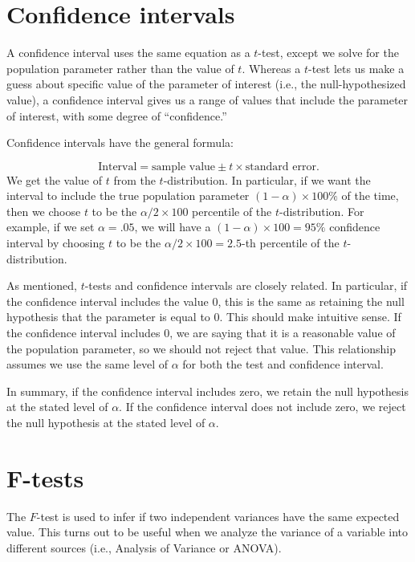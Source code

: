\documentclass[
  letterpaper,
  DIV=11,
  numbers=noendperiod]{scrreprt}
\begin{document}
\hypertarget{confidence-intervals}{%
\section{Confidence intervals}\label{confidence-intervals}}

A confidence interval uses the same equation as a \(t\)-test, except we
solve for the population parameter rather than the value of \(t\).
Whereas a \(t\)-test lets us make a guess about specific value of the
parameter of interest (i.e., the null-hypothesized value), a confidence
interval gives us a range of values that include the parameter of
interest, with some degree of ``confidence.''

Confidence intervals have the general formula:

\[\text{Interval} = \text{sample value} \pm t \times {\text{standard error}}. \]
We get the value of \(t\) from the \(t\)-distribution. In particular, if
we want the interval to include the true population parameter
\((1-\alpha) \times 100\%\) of the time, then we choose \(t\) to be the
\(\alpha/2 \times 100\) percentile of the \(t\)-distribution. For
example, if we set \(\alpha = .05\), we will have a
\((1-\alpha) \times 100 = 95\%\) confidence interval by choosing \(t\)
to be the \(\alpha/2 \times 100 = 2.5\)-th percentile of the
\(t\)-distribution.

As mentioned, \(t\)-tests and confidence intervals are closely related.
In particular, if the confidence interval includes the value \(0\), this
is the same as retaining the null hypothesis that the parameter is equal
to \(0\). This should make intuitive sense. If the confidence interval
includes \(0\), we are saying that it is a reasonable value of the
population parameter, so we should not reject that value. This
relationship assumes we use the same level of \(\alpha\) for both the
test and confidence interval.

In summary, if the confidence interval includes zero, we retain the null
hypothesis at the stated level of \(\alpha\). If the confidence interval
does not include zero, we reject the null hypothesis at the stated level
of \(\alpha\).

\hypertarget{f-tests}{%
\section{F-tests}\label{f-tests}}

The \(F\)-test is used to infer if two independent variances have the
same expected value. This turns out to be useful when we analyze the
variance of a variable into different sources (i.e., Analysis of
Variance or ANOVA).
\end{document}
